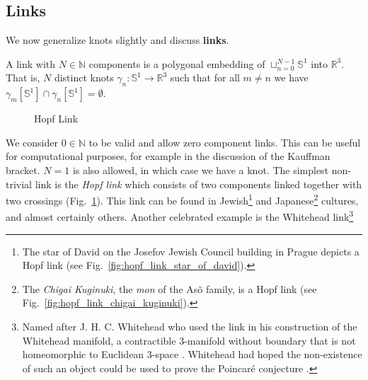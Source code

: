     \subsection{Links}
        We now generalize knots slightly and discuss \textbf{links}.
        \begin{definition}
            A link with $N\in\mathbb{N}$ components is a polygonal embedding of
            $\sqcup_{n=0}^{N-1}\mathbb{S}^{1}$ into $\mathbb{R}^{3}$.
            That is, $N$ distinct knots
            $\gamma_{n}:\mathbb{S}^{1}\rightarrow\mathbb{R}^{3}$ such that for
            all $m\ne{n}$ we have
            $\gamma_{m}[\mathbb{S}^{1}]\cap\gamma_{n}[\mathbb{S}^{1}]=\emptyset$.
        \end{definition}
        \begin{figure}
            \centering
            \caption{Hopf Link}
            \label{fig:hopf_link_diagram}
        \end{figure}
        We consider $0\in\mathbb{N}$ to be valid and allow zero component links.
        This can be useful for computational purposes, for example in the
        discussion of the Kauffman bracket. $N=1$ is also allowed, in which
        case we have a knot. The simplest non-trivial link is the
        \textit{Hopf link} which consists of two components linked together
        with two crossings (Fig.~\ref{fig:hopf_link_diagram}).
        This link can be found in Jewish\footnote{%
            The star of David on the Josefov Jewish Council building in Prague
            depicts a Hopf link \cite{KatlasHopfLink}
            (see Fig.~\ref{fig:hopf_link_star_of_david}).
        }
        and Japanese\footnote{%
            The \textit{Chigai Kuginuki}, the \textit{mon}
            of the As\~{o} family, is a Hopf link \cite{KatlasHopfLink}
            (see Fig.~\ref{fig:hopf_link_chigai_kuginuki}).
        }
        cultures, and almost certainly others. Another celebrated example is
        the Whitehead link\footnote{%
            Named after J. H. C. Whitehead who used the link in his
            construction of the Whitehead
            manifold, a contractible 3-manifold without boundary that is not
            homeomorphic to Euclidean 3-space \cite{WhiteheadManifold}.
            Whitehead had hoped the non-existence of such an object could be
            used to prove the Poincar\'{e} conjecture
            \cite{WhiteheadPoincareConjecture}.
        }
